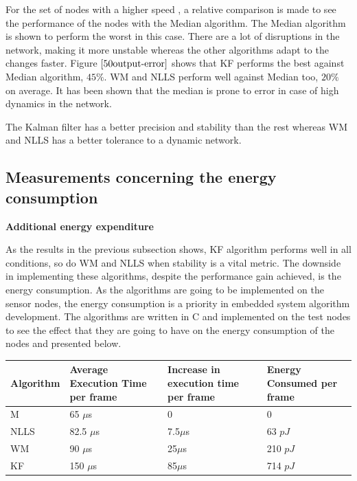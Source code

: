 \documentclass[journal]{IEEEtran}
\begin{document}
\par
For the set of nodes with a higher speed , a relative comparison is made to see the performance of the nodes with the Median algorithm. The Median algorithm is shown to perform the worst in this case. There are a lot of disruptions in the network, making it more unstable whereas the other algorithms adapt to the changes faster. Figure $\ref{50output-error}$ shows that KF performs the best against Median algorithm, $45\%$. WM and NLLS perform well against Median too, $20\%$ on average. It has been shown that the median is prone to error in case of high dynamics in the network.
\par
The Kalman filter has a better precision and stability than the rest whereas WM and NLLS has a better tolerance to a dynamic network.
\subsection{\textbf{Measurements concerning the energy consumption}}\noindent
\textbf{Additional energy expenditure}\par \noindent
As the results in the previous subsection shows, KF algorithm performs well in all conditions, so do WM and NLLS when stability is a vital metric. The downside in implementing these algorithms, despite the performance gain achieved, is the energy consumption. As the algorithms are going to be implemented on the sensor nodes, the energy consumption is a priority in embedded system algorithm development. The algorithms are written in C and implemented on the test nodes to see the effect that they are going to have on the energy consumption of the nodes and presented below.
\begin{center}
    \begin{tabular}{ |p{1.5cm} | p{2cm} |p{2cm} |p{1.75cm} | }
    \hline \hline
    Algorithm & Average Execution Time per frame & Increase in execution time per frame & Energy Consumed per frame \\ \hline
    M &  65 $\mu$s & 0 & 0  \\ \hline
    NLLS & 82.5 $\mu$s & 7.5$\mu$s & 63 $pJ$  \\ \hline
    WM &   90 $\mu$s & 25$\mu$s & 210 $pJ$ \\ \hline
    KF &  150 $\mu$s  & 85$\mu$s &  714 $pJ$\\ \hline
    \end{tabular}
\label{tab}
\end{center}
\end{document}
